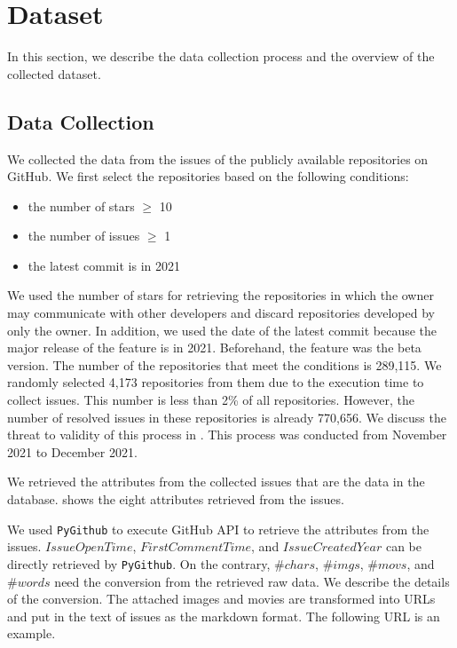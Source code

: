 \section{Dataset}
\label{sec:dataset}

In this section, we describe the data collection process and 
the overview of the collected dataset. 

\subsection{Data Collection}
We collected the data from the issues of 
the publicly available repositories on GitHub. 
We first select the repositories based on the following conditions:
\begin{itemize}
	\item the number of stars $\geq$ 10
	\item the number of issues $\geq$ 1
	\item the latest commit is in 2021
\end{itemize}
We used the number of stars for retrieving the repositories 
in which the owner may communicate with other developers and 
discard repositories developed by only the owner. 
In addition, we used the date of the latest commit 
because the major release of the feature is in 2021. 
Beforehand, the feature was the beta version. 
The number of the repositories that meet 
the conditions is 289,115. 
We randomly selected 4,173 repositories from them 
due to the execution time to collect issues. 
This number is less than 2\% of all repositories. 
However, the number of resolved issues 
in these repositories is already 770,656. 
We discuss the threat to validity of 
this process in . 
This process was conducted from November 2021 to December 2021.



We retrieved the attributes from the collected issues 
that are the data in the database. 
 shows the eight attributes 
retrieved from the issues. 

We used \texttt{PyGithub} to execute GitHub API 
to retrieve the attributes from the issues. 
$IssueOpenTime$, $FirstCommentTime$,
and $IssueCreatedYear$ can be directly
retrieved by \texttt{PyGithub}.
On the contrary,
$\#chars$, $\#imgs$, $\#movs$, and $\#words$
need the conversion from the retrieved raw data.
We describe the details of the conversion. 
The attached images and movies are transformed into 
URLs and put in the text of issues as the markdown format. 
The following URL is an example.

